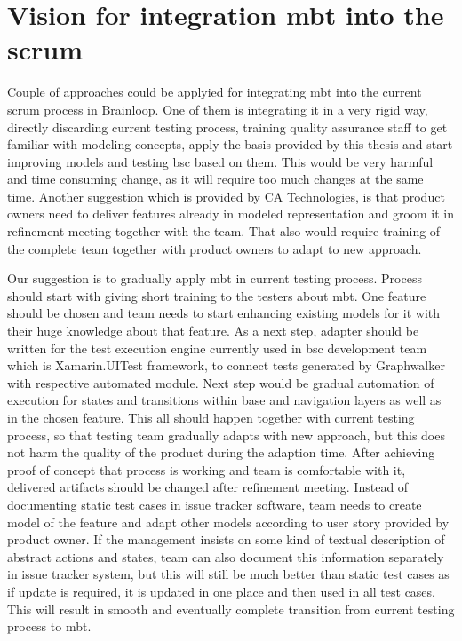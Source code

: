 \section{Vision for integration \acrshort{mbt} into the scrum}

\par
Couple of approaches could be applyied for integrating \acrshort{mbt} into the current scrum process in Brainloop. One of them is integrating it in a very rigid way, directly discarding current testing process, training quality assurance staff to get familiar with modeling concepts, apply the basis provided by this thesis and start improving models and testing \acrshort{bsc} based on them. This would be very harmful and time consuming change, as it will require too much changes at the same time. Another suggestion which is provided by CA Technologies, is that product owners need to deliver features already in modeled representation and groom it in refinement meeting together with the team. That also would require training of the complete team together with product owners to adapt to new approach.

\par
Our suggestion is to gradually apply \acrshort{mbt} in current testing process. Process should start with giving short training to the testers about \acrshort{mbt}. One feature should be chosen and team needs to start enhancing existing models for it with their huge knowledge about that feature. As a next step, adapter should be written for the test execution engine currently used in \acrshort{bsc} development team which is Xamarin.UITest framework, to connect tests generated by Graphwalker with respective automated module. Next step would be gradual automation of execution for states and transitions within base and navigation layers as well as in the chosen feature. This all should happen together with current testing process, so that testing team gradually adapts with new approach, but this does not harm the quality of the product during the adaption time. After achieving proof of concept that process is working and team is comfortable with it, delivered artifacts should be changed after refinement meeting. Instead of documenting static test cases in issue tracker software, team needs to create model of the feature and adapt other models according to user story provided by product owner. If the management insists on some kind of textual description of abstract actions and states, team can also document this information separately in issue tracker system, but this will still be much better than static test cases as if update is required, it is updated in one place and then used in all test cases. This will result in smooth and eventually complete transition from current testing process to \acrshort{mbt}.